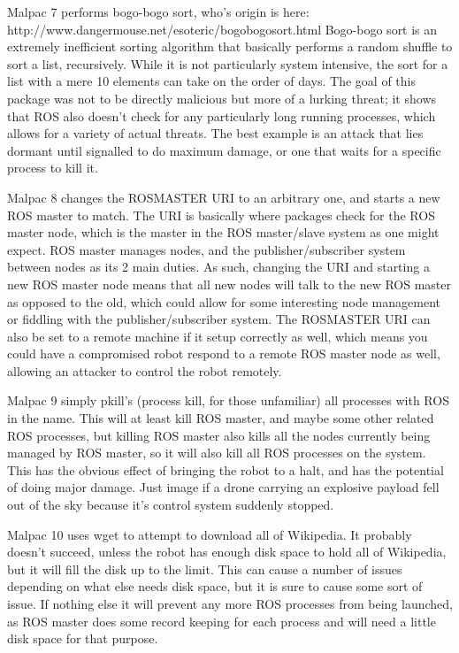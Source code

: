 \documentclass[IEEEtran,letterpaper,10pt,notitlepage,draftclsnofoot,onecolumn]{article}
\begin{document}
Malpac 7 performs bogo-bogo sort, who’s origin is here: http://www.dangermouse.net/esoteric/bogobogosort.html
Bogo-bogo sort is an extremely inefficient sorting algorithm that basically performs a random shuffle to sort a list, recursively. 
While it is not particularly system intensive, the sort for a list with a mere 10 elements can take on the order of days. 
The goal of this package was not to be directly malicious but more of a lurking threat; it shows that ROS also doesn’t check for any particularly long running processes, which allows for a variety of actual threats. 
The best example is an attack that lies dormant until signalled to do maximum damage, or one that waits for a specific process to kill it. 

Malpac 8 changes the ROSMASTER URI to an arbitrary one, and starts a new ROS master to match. 
The URI is basically where packages check for the ROS master node, which is the master in the ROS master/slave system as one might expect. 
ROS master manages nodes, and the publisher/subscriber system between nodes as its 2 main duties. 
As such, changing the URI and starting a new ROS master node means that all new nodes will talk to the new ROS master as opposed to the old, which could allow for some interesting node management or fiddling with the publisher/subscriber system. 
The ROSMASTER URI can also be set to a remote machine if it setup correctly as well, which means you could have a compromised robot respond to a remote ROS master node as well, allowing an attacker to control the robot remotely. 

Malpac 9 simply pkill’s (process kill, for those unfamiliar) all processes with ROS in the name. 
This will at least kill ROS master, and maybe some other related ROS processes, but killing ROS master also kills all the nodes currently being managed by ROS master, so it will also kill all ROS processes on the system. 
This has the obvious effect of bringing the robot to a halt, and has the potential of doing major damage. 
Just image if a drone carrying an explosive payload fell out of the sky because it’s control system suddenly stopped.

Malpac 10 uses wget to attempt to download all of Wikipedia. 
It probably doesn’t succeed, unless the robot has enough disk space to hold all of Wikipedia, but it will fill the disk up to the limit. 
This can cause a number of issues depending on what else needs disk space, but it is sure to cause some sort of issue. 
If nothing else it will prevent any more ROS processes from being launched, as ROS master does some record keeping for each process and will need a little disk space for that purpose. 
\end{document}
